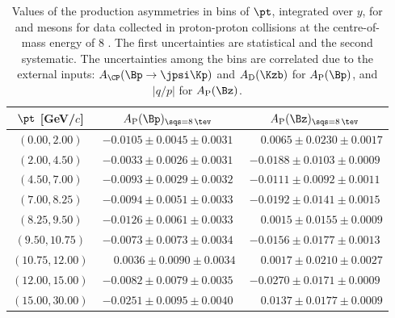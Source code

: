 \begin{table}
\caption{Values of the production asymmetries in bins of $\pt$, integrated over $y$, for \Bp and \Bz mesons for data collected in proton-proton collisions at the centre-of-mass energy of  8 \tev. The first uncertainties are statistical and the second systematic. The uncertainties among the bins are correlated due to the external inputs: $A_{\CP}(\Bp\to\jpsi\Kp)$ and $A_{\rm D}(\Kzb)$ for $A_{\rm P}(\Bp)$, and $|q/p|$ for $A_{\rm P}(\Bz)$.}
\label{tab:AP_BpB0_2012_pt}
\begin{center}
\begin{tabular}{c|c|c}
$\pt$ [GeV/$c$]& $A_{\rm P}(\Bp)_{\sqs = 8\, \tev}$ & $A_{\rm P}(\Bz)_{\sqs = 8\, \tev}$  \\
\hline
$(0.00,   2.00)   $  &  $  -0.0105            \pm  0.0045  \pm  0.0031  $  &  $  \phantom{-}0.0065  \pm  0.0230  \pm  0.0017  $  \\
$(2.00,   4.50)   $  &  $  -0.0033            \pm  0.0026  \pm  0.0031  $  &  $  -0.0188            \pm  0.0103  \pm  0.0009  $  \\
$(4.50,   7.00)   $  &  $  -0.0093            \pm  0.0029  \pm  0.0032  $  &  $  -0.0111            \pm  0.0092  \pm  0.0011  $  \\
$(7.00,   8.25)   $  &  $  -0.0094            \pm  0.0051  \pm  0.0033  $  &  $  -0.0192            \pm  0.0141  \pm  0.0015  $  \\
$(8.25,   9.50)   $  &  $  -0.0126            \pm  0.0061  \pm  0.0033  $  &  $  \phantom{-}0.0015  \pm  0.0155  \pm  0.0009  $  \\
$(9.50,   10.75)  $  &  $  -0.0073            \pm  0.0073  \pm  0.0034  $  &  $  -0.0156            \pm  0.0177  \pm  0.0013  $  \\
$(10.75,  12.00)  $  &  $  \phantom{-}0.0036  \pm  0.0090  \pm  0.0034  $  &  $  \phantom{-}0.0017  \pm  0.0210  \pm  0.0027  $  \\
$(12.00,  15.00)  $  &  $  -0.0082            \pm  0.0079  \pm  0.0035  $  &  $  -0.0270            \pm  0.0171  \pm  0.0009  $  \\
$(15.00,  30.00)  $  &  $  -0.0251            \pm  0.0095  \pm  0.0040  $  &  $  \phantom{-}0.0137  \pm  0.0177  \pm  0.0009  $  \\
\end{tabular}
\end{center}
\end{table}



